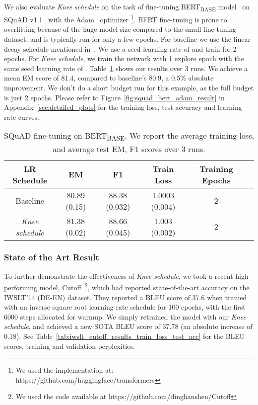 \documentclass[twoside,11pt]{article}
\newcommand{\lrschedule}{\textit{Knee schedule}}
\begin{document}
We also evaluate \lrschedule{} on the task of fine-tuning BERT\textsubscript{BASE} model~\cite{devlin2018bert} on SQuAD v1.1~\cite{rajpurkar2016squad} with the Adam~\cite{kingma2014adam} optimizer \footnote{We used the implementation at: https://github.com/huggingface/transformers}. BERT fine-tuning is prone to overfitting because of the huge model size compared to the small fine-tuning dataset, and is typically run for only a few epochs. For baseline we use the linear decay schedule mentioned in~\cite{devlin2018bert}. We use a seed learning rate of  and train for 2 epochs. For \lrschedule{}, we train the network with 1 explore epoch with the same seed learning rate of . Table~\ref{tab:squad_results} shows our results over 3 runs. We achieve a mean EM score of 81.4, compared to baseline's 80.9, a 0.5\% absolute improvement. We don't do a short budget run for this example, as the full budget is just 2 epochs. Please refer to Figure~\ref{fig:squad_bert_adam_result} in Appendix~\ref{sec:detailed_plots} for the training loss, test accuracy and learning rate curves.

\begin{table}[h]
\small
\centering
\caption{SQuAD fine-tuning on BERT\textsubscript{BASE}. We report the average training loss, and average test EM, F1 scores over 3 runs.}
\label{tab:squad_results}
{\setlength{\extrarowheight}{1pt}\begin{tabular}{cccccc}
  \toprule
  LR Schedule & EM  & F1 & Train Loss & Training Epochs \\
  \midrule
  Baseline   & 80.89 (0.15) & 88.38 (0.032) & 1.0003 (0.004) & 2\\
  \lrschedule{}{}   & 81.38 (0.02) & 88.66 (0.045) & 1.003 (0.002) & 2 \\
  \bottomrule
\end{tabular}}

\end{table}


\subsubsection{State of the Art Result}
To further demonstrate the effectiveness of \lrschedule{}, we took a recent high performing model, Cutoff~\citep{shen2020simple}\footnote{We used the code available at https://github.com/dinghanshen/Cutoff}, which had reported state-of-the-art accuracy on the IWSLT'14 (DE-EN) dataset. They reported a BLEU score of 37.6 when trained with an inverse square root learning rate schedule for 100 epochs, with the first 6000 steps allocated for warmup. We simply retrained the model with our \lrschedule{}, and achieved a new SOTA BLEU score of 37.78 (an absolute increase of 0.18). See Table~\ref{tab:iwslt_cutoff_results_train_loss_test_acc} for the BLEU scores, training and validation perplexities.
\end{document}
